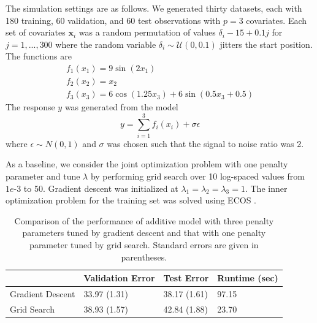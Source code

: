 \documentclass[12pt,letterpaper]{article}
\begin{document}
The simulation settings are as follows. We generated thirty datasets, each with 180 training, 60 validation, and 60 test observations with $p=3$ covariates. Each set of covariates $\boldsymbol{x}_i$ was a random permutation of values $\delta_i - 15 + 0.1 j$ for $j=1,...,300$ where the random variable $\delta_i \sim \mathcal{U}(0, 0.1)$ jitters the start position. The functions are 
\begin{equation}
\begin{array}{c}
f_1(x_1) = 9 \sin(2x_1)\\
f_2(x_2) = x_2 \\
f_3(x_3) = 6 \cos(1.25 x_3) + 6 \sin(0.5 x_3 + 0.5)
\end{array}
\end{equation}
The response $y$ was generated from the model 
\begin{equation}
y=\sum _{i=1}^3 f_i(x_i) + \sigma \epsilon
\end{equation}
where $\epsilon \sim N(0, 1)$ and $\sigma$ was chosen such that the signal to noise ratio was 2.

As a baseline, we consider the joint optimization problem with one penalty parameter and tune $\lambda$ by performing grid search over 10 log-spaced values from $1e$-3 to 50. Gradient descent was initialized at $\lambda_1=\lambda_2=\lambda_3=1$. The inner optimization problem for the training set was solved using ECOS \citep{Domahidi2013ecos}.

\begin{table}
\begin{center}
\begin{tabular}{| l | l | l | l | }
\hline
& Validation Error & Test Error & Runtime (sec) \\
\hline
Gradient Descent & 33.97 (1.31) & 38.17 (1.61) & 97.15 \\
\hline
Grid Search & 38.93 (1.57) & 42.84 (1.88) & 23.70 \\
\hline
\end{tabular}
\end{center}
\caption {Comparison of the performance of additive model with three penalty parameters tuned by gradient descent and that with one penalty parameter tuned by grid search. Standard errors are given in parentheses.}
\label{tab:additive}
\end{table}
\end{document}
